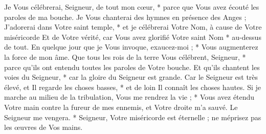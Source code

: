  Je Vous célébrerai, Seigneur, de tout mon cœur, * parce que Vous avez écouté les paroles de ma bouche. Je Vous chanterai des hymnes en présence des Anges ;
\versseparator
 J'adorerai dans Votre saint temple, * et je célébrerai Votre Nom, à cause de Votre miséricorde
\versseparator
 Et de Votre vérité, car Vous avez glorifié Votre saint Nom * au-dessus de tout.
\versseparator
 En quelque jour que je Vous invoque, exaucez-moi ; * Vous augmenterez la force de mon âme.
\versseparator
 Que tous les rois de la terre Vous célébrent, Seigneur, * parce qu'ils ont entendu toutes les paroles de Votre bouche.
\versseparator
 Et qu'ils chantent les voies du Seigneur, * car la gloire du Seigneur est grande.
\versseparator
 Car le Seigneur est très élevé, et Il regarde les choses basses, * et de loin Il connaît les choses hautes.
\versseparator
 Si je marche au milieu de la tribulation, Vous me rendrez la vie ; * Vous avez étendu Votre main contre la fureur de mes ennemis, et Votre droite m'a sauvé.
\versseparator
 Le Seigneur me vengera. * Seigneur, Votre miséricorde est éternelle ; ne méprisez pas les œuvres de Vos mains.